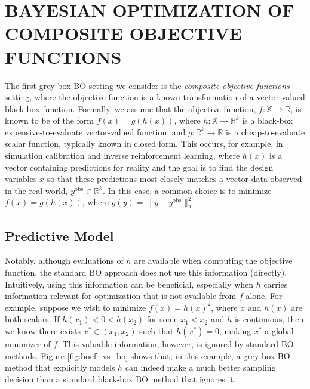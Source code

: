 \documentclass{wscpaperproc}
\newcommand{\R}{\mathbb{R}}
\newcommand{\X}{\mathbb{X}}
\theoremstyle{wsc}
\begin{document}
\section{BAYESIAN OPTIMIZATION OF COMPOSITE OBJECTIVE FUNCTIONS}
\label{sec:composite-BO}
The first grey-box BO setting we consider is the \textit{composite objective functions} setting, where the objective function is a known transformation of a vector-valued black-box function. Formally, we assume that the objective function, $f:\X\rightarrow\R$, is known to be of the form $f(x) = g(h(x))$, where $h:\X\rightarrow\R^k$ is a black-box expensive-to-evaluate vector-valued function, and $g:\R^k\rightarrow\R$ is a cheap-to-evaluate scalar function, typically known in closed form. This occurs, for example, in simulation calibration and inverse reinforcement learning, where $h(x)$ is a vector containing predictions for reality and the goal is to find the design variables $x$ so that these predictions most closely matches a vector data observed in the real world, $y^{\mathrm{obs}}\in\R^k$. In this case, a common choice is to minimize $f(x) = g(h(x))$, where $g(y)=\|y - y^{\mathrm{obs}}\|_2^2$.


\subsection{Predictive Model}
Notably, although evaluations of $h$ are available when computing the objective function, the standard BO approach does not use this information (directly). Intuitively, using this information can be beneficial, especially when $h$ carries information relevant for optimization that is not available from $f$ alone. For example, suppose we wish to minimize $f(x)=h(x)^2$, where $x$ and $h(x)$ are both scalars. If $h(x_1)< 0 < h(x_2)$ for some $x_1 < x_2$ and $h$ is continuous, then we know there exists $x^*\in(x_1,x_2)$ such that $h(x^*)=0$, making $x^*$  a global minimizer of $f$. This valuable information, however, is ignored by standard BO methods.  Figure \ref{fig:bocf_vs_bo} shows that, in this example, a grey-box BO method that explicitly models $h$ can indeed make a much better sampling decision than a standard black-box BO method that ignores it.
\end{document}
